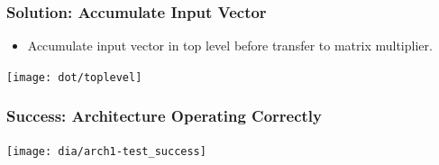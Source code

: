 \documentclass[gray]{beamer}
\begin{document}
\begin{frame}
\frametitle{Solution: Accumulate Input Vector}
\begin{itemize}
\item Accumulate input vector in top level before transfer to matrix multiplier.
\end{itemize}
\begin{center}
\texttt{[image: dot/toplevel]}
\end{center}
\end{frame}

\begin{frame}
\frametitle{Success: Architecture Operating Correctly}
\begin{center}
\texttt{[image: dia/arch1-test\_success]}
\end{center}
\end{frame}
\end{document}
